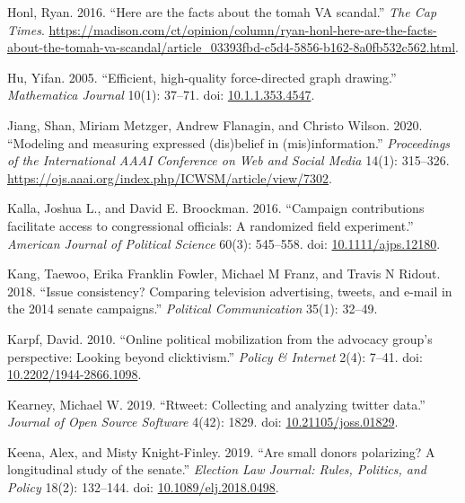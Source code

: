 \documentclass[12pt,]{article}
\newlength{\cslhangindent}
\newenvironment{CSLReferences}[2]%
    {\setlength{\parindent}{0pt}%
    \everypar{\setlength{\hangindent}{\cslhangindent}}\ignorespaces}%
    {\par}
\begin{document}
\begin{CSLReferences}{1}{0}
\leavevmode{}%
Honl, Ryan. 2016. {``Here are the facts about the tomah VA scandal.''}
\emph{The Cap Times}.
\url{https://madison.com/ct/opinion/column/ryan-honl-here-are-the-facts-about-the-tomah-va-scandal/article_03393fbd-c5d4-5856-b162-8a0fb532c562.html}.

\leavevmode{}%
Hu, Yifan. 2005. {``Efficient, high-quality force-directed graph
drawing.''} \emph{Mathematica Journal} 10(1): 37--71. doi:
\href{https://doi.org/10.1.1.353.4547}{10.1.1.353.4547}.

\leavevmode{}%
Jiang, Shan, Miriam Metzger, Andrew Flanagin, and Christo Wilson. 2020.
{``Modeling and measuring expressed (dis)belief in (mis)information.''}
\emph{Proceedings of the International AAAI Conference on Web and Social
Media} 14(1): 315--326.
\url{https://ojs.aaai.org/index.php/ICWSM/article/view/7302}.

\leavevmode{}%
Kalla, Joshua L., and David E. Broockman. 2016. {``Campaign
contributions facilitate access to congressional officials: A randomized
field experiment.''} \emph{American Journal of Political Science} 60(3):
545--558. doi:
\href{https://doi.org/10.1111/ajps.12180}{10.1111/ajps.12180}.

\leavevmode{}%
Kang, Taewoo, Erika Franklin Fowler, Michael M Franz, and Travis N
Ridout. 2018. {``Issue consistency? Comparing television advertising,
tweets, and e-mail in the 2014 senate campaigns.''} \emph{Political
Communication} 35(1): 32--49.

\leavevmode{}%
Karpf, David. 2010. {``Online political mobilization from the advocacy
group's perspective: Looking beyond clicktivism.''} \emph{Policy \&
Internet} 2(4): 7--41. doi:
\href{https://doi.org/10.2202/1944-2866.1098}{10.2202/1944-2866.1098}.

\leavevmode{}%
Kearney, Michael W. 2019. {``Rtweet: Collecting and analyzing twitter
data.''} \emph{Journal of Open Source Software} 4(42): 1829. doi:
\href{https://doi.org/10.21105/joss.01829}{10.21105/joss.01829}.

\leavevmode{}%
Keena, Alex, and Misty Knight-Finley. 2019. {``Are small donors
polarizing? A longitudinal study of the senate.''} \emph{Election Law
Journal: Rules, Politics, and Policy} 18(2): 132--144. doi:
\href{https://doi.org/10.1089/elj.2018.0498}{10.1089/elj.2018.0498}.


\end{CSLReferences}
\end{document}
